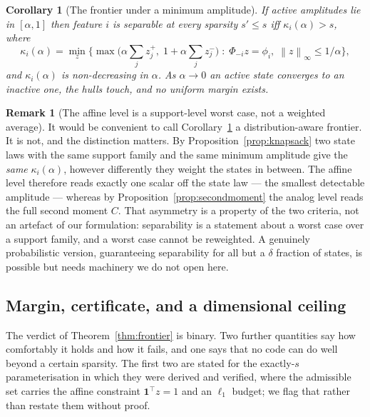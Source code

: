 \documentclass[preprint,12pt]{elsarticle}
\newtheorem{corollary}[theorem]{Corollary}
\theoremstyle{definition}
\newtheorem{remark}[theorem]{Remark}
\newcommand{\norm}[1]{\left\lVert #1 \right\rVert}
\begin{document}
\begin{corollary}[The frontier under a minimum amplitude]
\label{cor:kappa-alpha}
If active amplitudes lie in $[\alpha,1]$ then feature $i$ is separable at every sparsity
$s'\le s$ iff $\kappa_i(\alpha)>s$, where
\[
  \kappa_i(\alpha)=\min_z\Big\{\max\big(\alpha\textstyle\sum_jz^{+}_j,\;
  1+\alpha\sum_jz^{-}_j\big)\;:\;\Phi_{-i}z=\phi_i,\;\norm{z}_\infty\le1/\alpha\Big\},
\]
and $\kappa_i(\alpha)$ is non-decreasing in $\alpha$. As $\alpha\to0$ an active state converges
to an inactive one, the hulls touch, and no uniform margin exists.
\end{corollary}

\begin{remark}[The affine level is a support-level worst case, not a weighted average]
\label{rem:notdistributional}
It would be convenient to call Corollary~\ref{cor:kappa-alpha} a distribution-aware frontier. It
is not, and the distinction matters. By Proposition~\ref{prop:knapsack} two state laws with the
same support family and the same minimum amplitude give the \emph{same} $\kappa_i(\alpha)$,
however differently they weight the states in between. The affine level therefore reads exactly
one scalar off the state law --- the smallest detectable amplitude --- whereas by
Proposition~\ref{prop:secondmoment} the analog level reads the full second moment $C$. That
asymmetry is a property of the two criteria, not an artefact of our formulation: separability is
a statement about a worst case over a support family, and a worst case cannot be reweighted. A
genuinely probabilistic version, guaranteeing separability for all but a $\delta$ fraction of
states, is possible but needs machinery we do not open here.
\end{remark}

\subsection{Margin, certificate, and a dimensional ceiling}
\label{sec:frontier-margin}

The verdict of Theorem~\ref{thm:frontier} is binary. Two further quantities say how comfortably
it holds and how it fails, and one says that no code can do well beyond a certain sparsity. The
first two are stated for the exactly-$s$ parameterisation in which they were derived and
verified, where the admissible set carries the affine constraint $\mathbf 1^{\top}z=1$ and an
$\ell_1$ budget; we flag that rather than restate them without proof.
\end{document}
